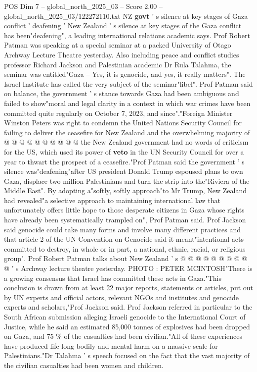 \begin{textsample}{POS Dim 7 – global\_north\_2025\_03 – Score 2.00 – global\_north\_2025\_03/122272110.txt}  \label{ex:f7_pos_322}
NZ \textbf{govt} ' s silence at key stages of Gaza conflict ' deafening ' New Zealand ' s silence at key stages of the Gaza conflict has been"deafening", a leading international relations academic says.
Prof Robert Patman was speaking at a special seminar at a packed University of Otago Archway Lecture Theatre yesterday.
Also including peace and conflict studies professor Richard Jackson and Palestinian academic Dr Rula Talahma, the seminar was entitled"Gaza -- Yes, it is genocide, and yes, it really matters".
The Israel Institute has called the very subject of the seminar"libel".
Prof Patman said on balance, the government ' s stance towards Gaza had been ambiguous and failed to show"moral and legal clarity in a context in which war crimes have been committed quite regularly on October 7, 2023, and since"."Foreign Minister Winston Peters was right to condemn the United Nations Security Council for failing to deliver the ceasefire for New Zealand and the overwhelming majority of @ @ @ @ @ @ @ @ @ @ the New Zealand government had no words of criticism for the US, which used its power of \textbf{veto} in the UN Security Council for over a year to thwart the prospect of a ceasefire."Prof Patman said the government ' s silence was"deafening"after US president Donald Trump espoused plans to own Gaza, displace two million Palestinians and turn the strip into the"Riviera of the Middle East".
By adopting a"softly, softly approach"to Mr Trump, New Zealand had revealed"a selective approach to maintaining international law that unfortunately offers little hope to those desperate citizens in Gaza whose rights have already been systematically trampled on", Prof Patman said.
Prof Jackson said genocide could take many forms and involve many different practices and that article 2 of the UN Convention on Genocide said it meant"intentional acts committed to destroy, in whole or in part, a national, ethnic, racial, or religious group".
Prof Robert Patman talks about New Zealand ' s @ @ @ @ @ @ @ @ @ @ ' s Archway lecture theatre yesterday.
PHOTO : PETER MCINTOSH"There is a growing consensus that Israel has committed these acts in Gaza."This conclusion is drawn from at least 22 major reports, statements or articles, put out by UN experts and official actors, relevant NGOs and institutes and genocide experts and scholars,"Prof Jackson said.
Prof Jackson referred in particular to the South African submission alleging Israeli genocide to the International Court of Justice, while he said an estimated 85,000 tonnes of explosives had been dropped on Gaza, and 75 \% of the casualties had been civilian."All of these experiences have produced life-long bodily and mental harm on a massive scale for Palestinians."Dr Talahma ' s speech focused on the fact that the vast majority of the civilian casualties had been women and children.

\end{textsample}
